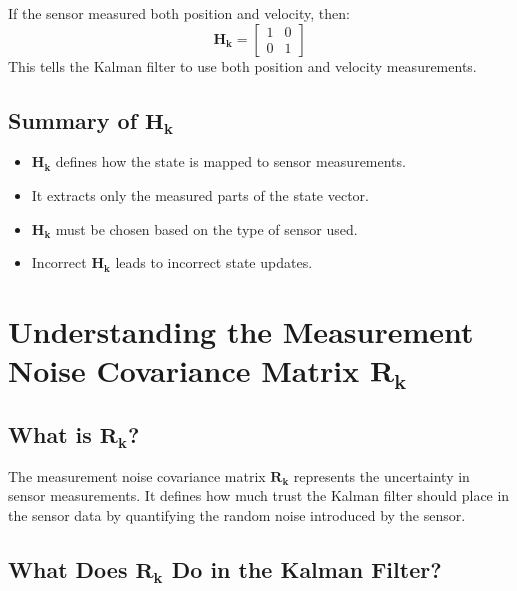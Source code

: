 \documentclass{article}
\begin{document}
If the sensor measured both position and velocity, then:
\[
\mathbf{H_k} =
\begin{bmatrix}
1 & 0 \\
0 & 1
\end{bmatrix}
\]
This tells the Kalman filter to use both position and velocity measurements.

\subsection*{Summary of \(\mathbf{H_k}\)}
\begin{itemize}
    \item \(\mathbf{H_k}\) defines how the state is mapped to sensor measurements.
    \item It extracts only the measured parts of the state vector.
    \item \(\mathbf{H_k}\) must be chosen based on the type of sensor used.
    \item Incorrect \(\mathbf{H_k}\) leads to incorrect state updates.
\end{itemize}


\newpage

\section{Understanding the Measurement Noise Covariance Matrix \(\mathbf{R_k}\)}

\subsection*{What is \(\mathbf{R_k}\)?}
The measurement noise covariance matrix \(\mathbf{R_k}\) represents the uncertainty in sensor measurements. It defines how much trust the Kalman filter should place in the sensor data by quantifying the random noise introduced by the sensor.

\subsection*{What Does \(\mathbf{R_k}\) Do in the Kalman Filter?}
\end{document}
